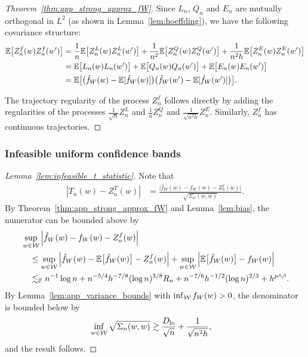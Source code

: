 \begin{proof}[Theorem~\ref{thm:app_strong_approx_fW}]
  Since $L_n$, $Q_n$ and $E_n$
  are mutually orthogonal in $L^2$
  (as shown in Lemma~\ref{lem:hoeffding}),
  we have the following covariance
  structure:
  \begin{align*}
    \mathbb{E}\big[Z_n^f(w) Z_n^f(w')\big]
    &=
    \frac{1}{n} \mathbb{E}\big[ Z_n^L(w) Z_n^L(w') \big]
    + \frac{1}{n^2} \mathbb{E}\big[ Z_n^Q(w) Z_n^Q(w') \big]
    + \frac{1}{n^2h} \mathbb{E}\big[ Z_n^E(w) Z_n^E(w') \big] \\
    &=
    \mathbb{E}\big[ L_n(w) L_n(w') \big]
    + \mathbb{E}\big[ Q_n(w) Q_n(w') \big]
    + \mathbb{E}\big[ E_n(w) E_n(w') \big] \\
    &=
    \mathbb{E}\big[
      \big(\hat f_W(w) - \mathbb{E}[\hat f_W(w)]\big)
      \big(\hat f_W(w') - \mathbb{E}[\hat f_W(w')]\big)
      \big].
  \end{align*}


  The trajectory regularity of the process
  $Z_n^f$ follows directly
  by adding the regularities
  of the processes $\frac{1}{\sqrt n} Z_n^L$
  and
  $\frac{1}{n} Z_n^Q$
  and
  $\frac{1}{\sqrt{n^2h}} Z_n^E$.
  Similarly, $Z_n^f$ has continuous trajectories.
\end{proof}

\subsubsection{Infeasible uniform confidence bands}

\begin{proof}[Lemma~\ref{lem:infeasible_t_statistic}]

  Note that
  \begin{align*}
    \left| T_n(w) - Z_n^T(w) \right|
    &= \frac{\big| \hat f_W(w) - f_W(w) - Z_n^f(w) \big|}
    {\sqrt{\Sigma_n(w,w)}}.
  \end{align*}
  By Theorem~\ref{thm:app_strong_approx_fW}
  and Lemma~\ref{lem:bias},
  the numerator can be bounded above by
  \begin{align*}
    &\sup_{w \in \mathcal{W}}
    \left|
    \hat f_W(w) - f_W(w)
    -
    Z_n^f(w)
    \right| \\
    &\quad\leq
    \sup_{w \in \mathcal{W}}
    \left|
    \hat f_W(w)
    - \mathbb{E}\big[\hat f_W(w)\big]
    -
    Z_n^f(w)
    \right|
    + \sup_{w \in \mathcal{W}}
    \left|
    \mathbb{E}\big[\hat f_W(w)\big]
    - f_W(w)
    \right| \\
    &\quad\lesssim_{\mathbb{P}}
    n^{-1} \log n
    + n^{-5/4} h^{-7/8} (\log n)^{3/8} R_n
    + n^{-7/6} h^{-1/2} (\log n)^{2/3}
    + h^{p \wedge \beta}.
  \end{align*}
  By Lemma~\ref{lem:app_variance_bounds}
  with $\inf_{\mathcal{W}} f_W(w) > 0$,
  the denominator is bounded below by
  \begin{align*}
    \inf_{w \in \mathcal{W}}
    \sqrt{\Sigma_n(w,w)}
    &\gtrsim
    \frac{D_{\textup{lo}}}{\sqrt n} + \frac{1}{\sqrt{n^2h}},
  \end{align*}
  and the result follows.
\end{proof}

